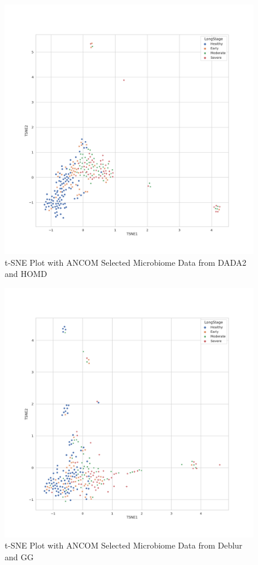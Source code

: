 \documentclass[a4paper]{article}
\begin{document}
            \begin{figure}[p]
                \centering
                \includegraphics[width=0.6 \linewidth]{figures/tSNE/ANCOM/ANCOM.DADA2.homd.png}
                \caption{t-SNE Plot with ANCOM Selected Microbiome Data from DADA2 and HOMD}
                \label{fig:tsne-ANCOM-dada2-homd}
            \end{figure}

            \begin{figure}[p]
                \centering
                \includegraphics[width=0.6 \linewidth]{figures/tSNE/ANCOM/ANCOM.Deblur.gg.png}
                \caption{t-SNE Plot with ANCOM Selected Microbiome Data from Deblur and GG}
                \label{fig:tsne-ANCOM-deblur-gg}
            \end{figure}
\end{document}

